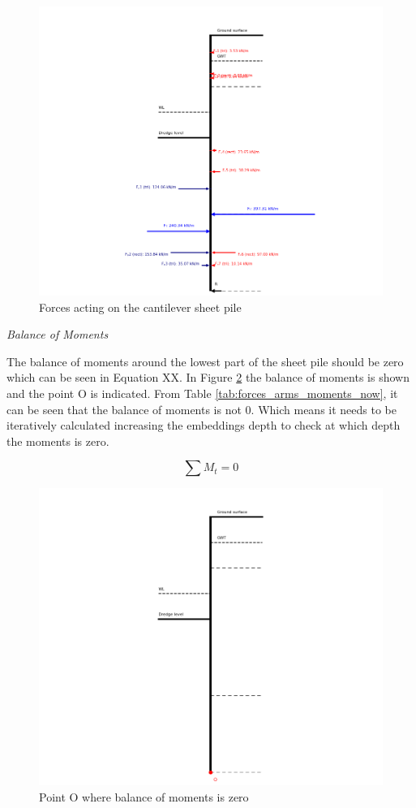 \begin{figure}[H]
    \centering
    \includegraphics[width=0.90\linewidth]{figures/ch8/force_balance.png}
    \caption{Forces acting on the cantilever sheet pile}
    \label{fig:forces_balance}
\end{figure}

\textit{Balance of Moments}


The balance of moments around the lowest part of the sheet pile should be zero which can be seen in Equation XX. In Figure \ref{fig:moments_point} the balance of moments is shown and the point O is indicated. From Table \ref{tab:forces_arms_moments_now}, it can be seen that the balance of moments is not 0. Which means it needs to be iteratively calculated increasing the embeddings depth to check at which depth the moments is zero.

\begin{equation}
    \sum{M_{t}} = 0
    \label{eq:moment}
\end{equation}

\begin{figure}[H]
    \centering
    \includegraphics[width=0.90\linewidth]{figures/ch8/moments_point.png}
    \caption{Point O where balance of moments is zero}
    \label{fig:moments_point}
\end{figure}

